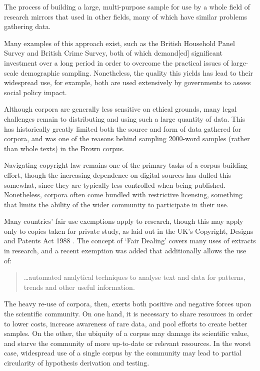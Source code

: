 The process of building a large, multi-purpose sample for use by a whole field of research mirrors that used in other fields, many of which have similar problems gathering data.

Many examples of this approach exist, such as the British Household Panel Survey and British Crime Survey\cite{taylor1996british,hough1983british}, both of which demand[ed] significant investment over a long period in order to overcome the practical issues of large-scale demographic sampling.  Nonetheless, the quality this yields has lead to their widespread use, for example, both are used extensively by governments to assess social policy impact.

Although corpora are generally less sensitive on ethical grounds, many legal challenges remain to distributing and using such a large quantity of data.  This has historically greatly limited both the source and form of data gathered for corpora, and was one of the reasons behind sampling 2000-word samples (rather than whole texts) in the Brown corpus.

Navigating copyright law remains one of the primary tasks of a corpus building effort, though the increasing dependence on digital sources has dulled this somewhat, since they are typically less controlled when being published.  Nonetheless, corpora often come bundled with restrictive licensing, something that limits the ability of the wider community to participate in their use.

Many countries' fair use exemptions apply to research, though this may apply only to copies taken for private study, as laid out in the UK's Copyright, Designs and Patents Act 1988
.  The concept of `Fair Dealing' covers many uses of extracts in research, and a recent exemption was added that additionally allows the use of\cite{intellectualpropertyofficeuk2014}:

\begin{quote}
\ldots{}automated analytical techniques to analyse text and data for patterns, trends and other useful information.
\end{quote}




The heavy re-use of corpora, then, exerts both positive and negative forces upon the scientific community.  On one hand, it is necessary to share resources in order to lower costs, increase awareness of rare data, and pool efforts to create better samples.  On the other, the ubiquity of a corpus may damage its scientific value, and starve the community of more up-to-date or relevant resources.  In the worst case, widespread use of a single corpus by the community may lead to partial circularity of hypothesis derivation and testing.

